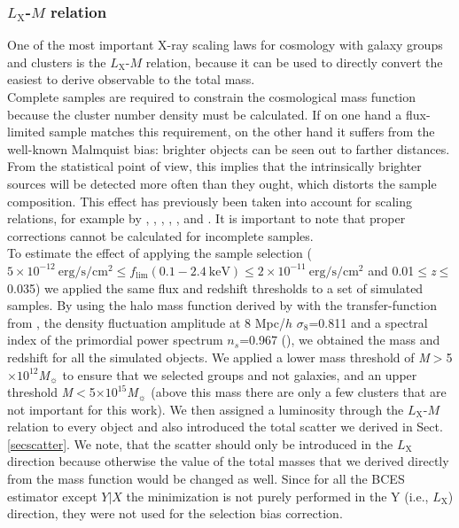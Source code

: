 \documentclass{aa} %
\begin{document}
\subsubsection{$L_{\text{X}}$-$M$ relation}
One of the most important X-ray scaling laws for cosmology with galaxy groups and clusters is the
$L_{\text{X}}$-$M$ relation, because it can be used to directly
convert the
easiest to derive observable to the total mass. \\
Complete samples are required to constrain the cosmological
mass function because the cluster number density must be
calculated. If on one hand a flux-limited sample matches this
requirement, on the other hand it suffers from the well-known Malmquist bias: brighter objects can be seen out to farther
distances. From the statistical point of view, this implies that the
intrinsically brighter sources will be detected more often than they
ought, which distorts the sample composition. This effect has
previously been taken into account for scaling relations, for example by \citet{2002A&A...383..773I}, \citet{2006ApJ...648..956S},
\citet{2007MNRAS.382.1289P}, \citet{2009ApJ...692.1033V},
\citet{2009A&A...498..361P}, and \citet{2011A&A...532A.133M}. It is important to note that proper corrections cannot be calculated for incomplete samples. \\
To estimate the effect of applying the sample selection ($5\times10^{-12} \ \text{erg/s/cm$^{2}$} \le f_{\text{lim}} (0.1-2.4 \ \text{keV}) \le 2\times10^{-11} \ \text{erg/s/cm$^{2}$}$ and 0.01$\le${\it z}$\le$0.035) we applied the same flux and redshift thresholds to a set of simulated
samples. By using the halo mass function derived by
\cite{2008ApJ...688..709T} with the transfer-function from
\cite{1998ApJ...496..605E}, the density fluctuation amplitude at 8
Mpc/$h$ $\sigma_8$=0.811 and a spectral index of the primordial power
spectrum $n_s$=0.967 (\citealt{2011ApJS..192...18K}), we obtained the mass and
redshift for all the simulated objects. We applied a lower mass
threshold of {\it M}$>$5$\times10^{12}${\it M$_{\sun}$} to ensure that we
selected groups and not galaxies, and an upper threshold {\it
  M}$<$5$\times10^{15}${\it M$_{\sun}$} (above this mass there are
only a few clusters that are not important for this
work). 
We then assigned a luminosity through the $L_{\text{X}}$-$M$ relation to every object and also introduced the total scatter we
derived in Sect. \ref{secscatter}. We note, that the scatter should only be introduced in the $L_{\text{X}}$ direction because otherwise the value of the total masses that we derived directly from the mass function would be changed as well. Since for all the BCES estimator except $Y|X$ the minimization is not purely performed in the Y (i.e., $L_{\text{X}}$) direction, they were not used for the selection bias correction.\\
\end{document}
